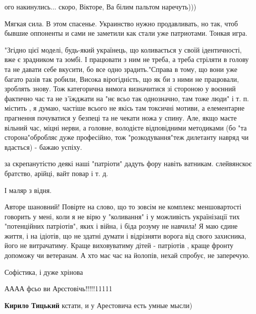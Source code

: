 \begin{itemize}
ого накинулись... скоро, Вікторе, Ва білим пальтом наречуть)))


Мягкая сила. В этом спасенье. Украинство нужно продавливать, но так, чтоб
бывшие оппоненты и сами не заметили как стали уже патриотами. Тонкая игра.


"Згідно цієї моделі, будь-який українець, що коливається у своїй ідентичності,
вже є зрадником та зомбі. І працювати з ним не треба, а треба стріляти в голову
та не давати себе вкусити, бо все одно зрадить."Справа в тому, що вони уже
багато разів так робили, Висока вірогідність, що як би з ними не працювали,
зроблять знову. Тож категорична вимога визначитися зі стороною у воєнний
фактично час та не з'їжджати на "нє всьо так однозначно, там тоже люди" і т. п.
містить , я думаю, частіше всього не якісь там токсичні мотиви, а елементарне
прагнення почуватися у безпеці та не чекати ножа у спину. Але, якщо маєте
вільний час, міцні нерви, а головне, володієте відповідними методиками (бо "та
сторона"обробляє дуже професійно, тож "розкодування"теж дилетанту навряд чи
вдасться) - бажаю успіху.


за скрепанутістю деякі наші "патріоти" дадуть фору навіть ватникам. слейвянскоє
братство, арійці, вайт повар і т. д.

\begin{itemize} %
І маляр з відня.
\end{itemize} %


Авторе шановний! Повірте на слово, що то зовсім не комплекс меншовартості
говорить у мені, коли я не вірю у "коливання" і у можливість українізації тих
"потенційних патріотів", яких і війна, і біда розуму не навчила! Я маю єдине
життя, і на ідіотів, що не здатні думати і відрізняти ворога від свого
захисника, його не витрачатиму. Краще виховуватиму дітей - патріотів , краще
фронту допоможу чи ветеранам. А хто має час на йолопів, нехай спробує, не
заперечую.


Софістика, і дуже хрінова

АААА фсьо ви Арєстовічь!!!!!11111

\begin{itemize} %
\textbf{Кирило Тицький} кстати, и у Арестовича есть умные мысли)


\end{itemize}
\end{itemize}
